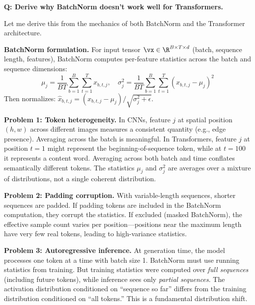 \begin{interviewq}
\textbf{Q: Derive why BatchNorm doesn't work well for Transformers.}

 \quad {} \quad \badgefreq{\freqmed}

\stronganswer

Let me derive this from the mechanics of both BatchNorm and the Transformer architecture.

\textbf{BatchNorm formulation.} For input tensor $\vx \in \R^{B \times T \times d}$ (batch, sequence length, features), BatchNorm computes per-feature statistics across the batch and sequence dimensions:
\begin{equation*}
\mu_j = \frac{1}{BT}\sum_{b=1}^B\sum_{t=1}^T x_{b,t,j}, \quad \sigma_j^2 = \frac{1}{BT}\sum_{b=1}^B\sum_{t=1}^T (x_{b,t,j} - \mu_j)^2
\end{equation*}
Then normalizes: $\hat{x}_{b,t,j} = (x_{b,t,j} - \mu_j)/\sqrt{\sigma_j^2 + \epsilon}$.

\textbf{Problem 1: Token heterogeneity.} In CNNs, feature $j$ at spatial position $(h,w)$ across different images measures a consistent quantity (e.g., edge presence). Averaging across the batch is meaningful. In Transformers, feature $j$ at position $t=1$ might represent the beginning-of-sequence token, while at $t=100$ it represents a content word. Averaging across both batch and time conflates semantically different tokens. The statistics $\mu_j$ and $\sigma_j^2$ are averages over a mixture of distributions, not a single coherent distribution.

\textbf{Problem 2: Padding corruption.} With variable-length sequences, shorter sequences are padded. If padding tokens are included in the BatchNorm computation, they corrupt the statistics. If excluded (masked BatchNorm), the effective sample count varies per position---positions near the maximum length have very few real tokens, leading to high-variance statistics.

\textbf{Problem 3: Autoregressive inference.} At generation time, the model processes one token at a time with batch size 1. BatchNorm must use running statistics from training. But training statistics were computed over \textit{full sequences} (including future tokens), while inference sees only \textit{partial sequences}. The activation distribution conditioned on ``sequence so far'' differs from the training distribution conditioned on ``all tokens.'' This is a fundamental distribution shift.


\end{interviewq}
